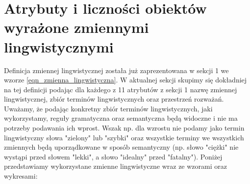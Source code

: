 \documentclass{classrep}
\begin{document}
\section{Atrybuty i liczności obiektów wyrażone zmiennymi lingwistycznymi}
Definicja zmiennej lingwistycznej została już zaprezentowana w sekcji 1 we wzorze \ref{eqn_zmienna_lingwistyczna}. W aktualnej sekcji skupimy się dokładniej na tej definicji podając dla każdego z 11 atrybutów z sekcji 1 nazwę zmiennej lingwistycznej, zbiór terminów lingwistycznych oraz przestrzeń rozważań. Uważamy, że podając konkretny zbiór terminów lingwistycznych, jaki wykorzystamy, reguły gramatyczna oraz semantyczna będą widoczne i nie ma potrzeby podawania ich wprost. Wszak np. dla wzrostu nie podamy jako termin lingwistyczny słowa "zielony" lub "szybki" oraz wszystkie terminy we wszystkich zmiennych będą uporządkowane w sposób semantyczny (np. słowo "ciężki" nie wystąpi przed słowem "lekki", a słowo "idealny" przed "fatalny"). Poniżej przedstawiamy wykorzystane zmienne lingwistyczne wraz ze wzorami oraz wykresami:
\end{document}

